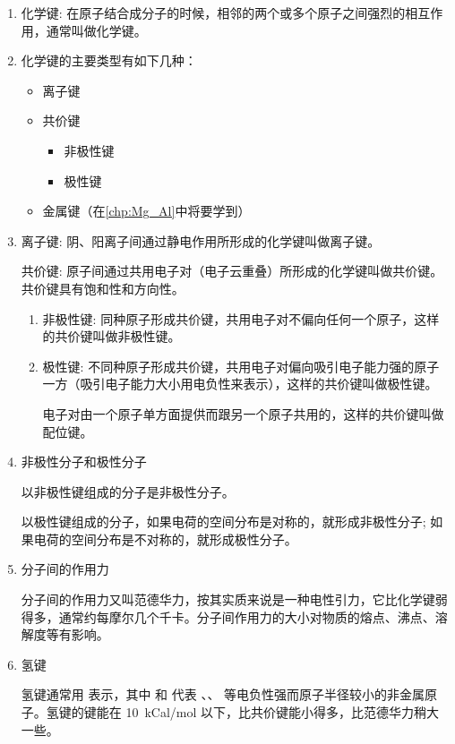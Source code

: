 \begin{enumerate}[1.]
  \item 化学键: 在原子结合成分子的时候，相邻的两个或多个原子之间强烈的相互作用，通常叫做化学键。
  \item 化学键的主要类型有如下几种：
  \begin{itemize}[leftmargin=5em]
    \item 离子键
    \item 共价键
    \begin{itemize}
      \item 非极性键
      \item 极性键
    \end{itemize}
    \item 金属键（在\cref{chp:Mg_Al}中将要学到）
  \end{itemize}
  \item 离子键: 阴、阳离子间通过静电作用所形成的化学键叫做离子键。
  
  共价键: 原子间通过共用电子对（电子云重叠）所形成的化学键叫做共价键。共价键具有饱和性和方向性。
  \begin{enumerate}
    \item 非极性键: 同种原子形成共价键，共用电子对不偏向任何一个原子，这样的共价键叫做非极性键。
    \item 极性键: 不同种原子形成共价键，共用电子对偏向吸引电子能力强的原子一方（吸引电子能力大小用电负性来表示），这样的共价键叫做极性键。
    
    电子对由一个原子单方面提供而跟另一个原子共用的，这样的共价键叫做配位键。
  \end{enumerate}
  \item 非极性分子和极性分子
  
  以非极性键组成的分子是非极性分子。

  以极性键组成的分子，如果电荷的空间分布是对称的，就形成非极性分子; 如果电荷的空间分布是不对称的，就形成极性分子。
  \item 分子间的作用力
  
  分子间的作用力又叫范德华力，按其实质来说是一种电性引力，它比化学键弱得多，通常约每摩尔几个千卡。分子间作用力的大小对物质的熔点、沸点、溶解度等有影响。
  \item 氢键
  
  氢键通常用  表示，其中  和  代表 、、 等电负性强而原子半径较小的非金属原子。氢键的键能在 \qty{10}{kCal/mol} 以下，比共价键能小得多，比范德华力稍大一些。
\end{enumerate}

